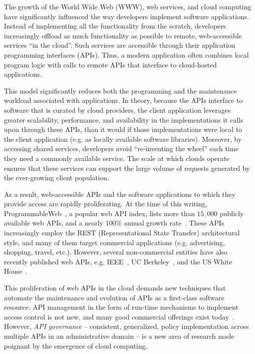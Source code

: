 The growth of the World Wide Web (WWW), web services, and cloud computing have
significantly influenced the way developers implement software applications.
Instead of implementing all the functionality from the scratch, developers
increasingly offload as much functionality as possible to remote,
web-accessible services ``in the cloud''. Such services are accessible through their
application programming interfaces (APIs). Thus, a modern application 
often combines local program logic
with calls to remote APIs that interface to cloud-hosted applications. 

This model significantly reduces both the programming and
the maintenance workload associated with applications. In theory, because
the APIs interface to software that is curated by cloud providers, the client
application leverages greater scalability, performance, 
and availability in the implementations it calls upon through these APIs, than
it would if those implementations were local to the client application
(e.g. as locally available software libraries).
Moreover, by accessing shared services, developers avoid ``re-inventing the
wheel'' each time they need a commonly available service. The scale at
which clouds operate ensures that these services can support the large volume
of requests generated by the ever-growing client population.

As a result, web-accessible APIs and the software applications to which
they provide access are rapidly proliferating. At the time of this writing, 
ProgrammableWeb~\cite{pweb}, a popular web API index, lists more than $15,000$
publicly available web APIs, and a nearly 100\% annual growth rate~\cite{pweb_growth}.
These APIs increasingly employ the REST (Representational State Transfer) architectural style, and 
many of them target commercial applications (e.g. advertising, shopping, travel, etc.).
However, several non-commercial entities have also recently published web 
APIs, e.g. IEEE~\cite{ieeeapis}, UC Berkeley~\cite{ucbapis}, and the US White
House~\cite{whitehouseapis}. 

This proliferation of web APIs in the cloud demands new techniques that
automate the maintenance and evolution of APIs as a first-class software
resource.  API management in the form of run-time mechanisms to implement
access control is not new, and many good commercial offerings exist today~\cite{3scale,apigee,layer7}.   
However, \textit{API governance} -- consistent, generalized, policy
implementation across multiple APIs in an administrative domain --
is a new area of research made poignant by the emergence of cloud computing.

